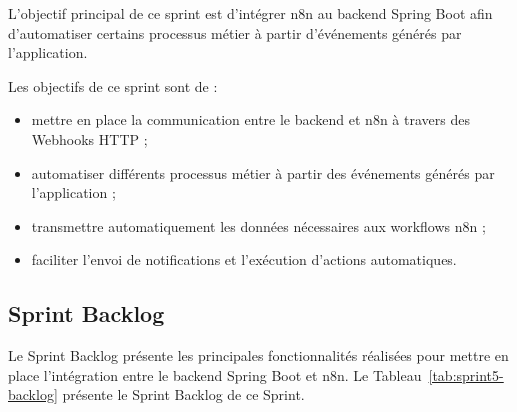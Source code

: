 L'objectif principal de ce sprint est d'intégrer n8n au backend Spring Boot
afin d'automatiser certains processus métier à partir d'événements générés
par l'application.

Les objectifs de ce sprint sont de :

\begin{itemize}

    \item mettre en place la communication entre le backend et n8n à travers
    des Webhooks HTTP ;

    \item automatiser différents processus métier à partir des événements
    générés par l'application ;

    \item transmettre automatiquement les données nécessaires aux workflows
    n8n ;

    \item faciliter l'envoi de notifications et l'exécution d'actions
    automatiques.

\end{itemize}


\subsection{Sprint Backlog}

Le Sprint Backlog présente les principales fonctionnalités réalisées pour
mettre en place l'intégration entre le backend Spring Boot et n8n.
Le Tableau~\ref{tab:sprint5-backlog} présente le Sprint Backlog de ce Sprint.


